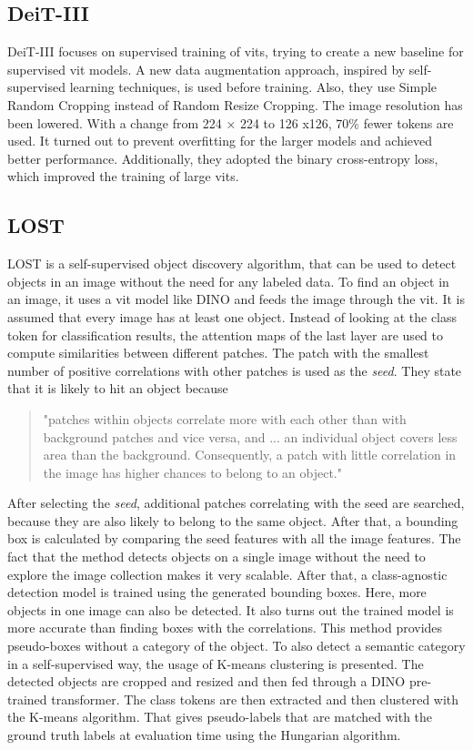 \documentclass[conference]{IEEEtran}
\begin{document}
  \subsection{\mbox{DeiT-III}}
  \label{sec:deit3}

  \mbox{DeiT-III} focuses on supervised training of \acp{vit}, trying to create a new baseline for supervised \ac{vit} models. A new data augmentation approach, inspired by self-supervised learning techniques, is used before training. Also, they use Simple Random Cropping instead of Random Resize Cropping. The image resolution has been lowered. With a change from 224 × 224 to 126 x126, 70\% fewer tokens are used. It turned out to prevent overfitting for the larger models and achieved better performance. Additionally, they adopted the binary cross-entropy loss, which improved the training of large \acp{vit}. \cite{deit3}

  \subsection{LOST}
  \label{chapter:lost}

  \mbox{LOST} is a self-supervised object discovery algorithm, that can be used to detect objects in an image without the need for any labeled data. To find an object in an image, it uses a \ac{vit} model like \mbox{DINO} and feeds the image through the \ac{vit}. It is assumed that every image has at least one object. Instead of looking at the class token for classification results, the attention maps of the last layer are used to compute similarities between different patches. The patch with the smallest number of positive correlations with other patches is used as the \textit{seed}. They state that it is likely to hit an object because
  \begin{quote}
    "patches within objects correlate more with each other than with background patches and vice versa, and ... an individual object covers less area than the background. Consequently, a patch with little correlation in the image has higher chances to belong to an object." \cite{lost}
  \end{quote}
  After selecting the \textit{seed}, additional patches correlating with the seed are searched, because they are also likely to belong to the same object. After that, a bounding box is calculated by comparing the seed features with all the image features. The fact that the method detects objects on a single image without the need to explore the image collection makes it very scalable. After that, a class-agnostic detection model is trained using the generated bounding boxes. Here, more objects in one image can also be detected. It also turns out the trained model is more accurate than finding boxes with the correlations. This method provides pseudo-boxes without a category of the object. To also detect a semantic category in a self-supervised way, the usage of K-means clustering is presented. The detected objects are cropped and resized and then fed through a \mbox{DINO} pre-trained transformer. The class tokens are then extracted and then clustered with the K-means algorithm. That gives pseudo-labels that are matched with the ground truth labels at evaluation time using the Hungarian algorithm. \cite{lost}
\end{document}
